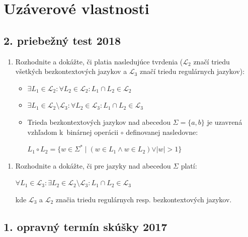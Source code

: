 \documentclass[11pt,a4paper]{article}
\begin{document}
	\section{Uzáverové vlastnosti}

		\subsection{2. priebežný test 2018}

		\begin{enumerate}
			\item Rozhodnite a dokážte, či platia nasledujúce tvrdenia ($\mathcal{L}_2$ značí triedu všetkých bezkontextových jazykov a $\mathcal{L}_3$ značí triedu regulárnych jazykov):

			\begin{itemize}
				\item $\exists L_1 \in \mathcal{L}_2: \forall L_2 \in \mathcal{L}_2: L_1 \cap L_2 \in \mathcal{L}_2$
	
				\item $\exists L_1 \in \mathcal{L}_2 \setminus \mathcal{L}_3: \forall L_2 \in \mathcal{L}_3: L_1 \cap L_2 \in \mathcal{L}_3$
	
				\item Trieda bezkontextových jazykov nad abecedou $\Sigma = \{a,b\}$ je uzavrená vzhľadom k~binárnej operácii $\circ$ definovanej nasledovne:
	
				$L_1 \circ L_2 = \{w \in \Sigma^* \mid (w \in L_1 \land w \in L_2) \lor \vert w \vert > 1\}$
			\end{itemize}
		\end{enumerate}

		\begin{enumerate}
			\item Rozhodnite a dokážte, či pre jazyky nad abecedou $\Sigma$ platí:

			$\forall L_1 \in \mathcal{L}_3: \exists L_2 \in \mathcal{L}_2 \setminus \mathcal{L}_3: L_1 \cap L_2 \in \mathcal{L}_3$
	
			kde $\mathcal{L}_3$ a $\mathcal{L}_2$ značia triedu regulárnych resp. bezkontextových jazykov.
		\end{enumerate}

		\subsection{1. opravný termín skúšky 2017}
\end{document}
